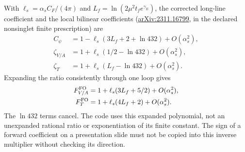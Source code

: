 \documentclass[11pt]{article}
\numberwithin{equation}{section}
\begin{document}
With \(\ell_s=\alpha_s C_F/(4\pi)\) and
\(L_f=\ln(2\mu^2t_fe^{\gamma_E})\), the corrected long-line coefficient
\cite{BrambillaWang2024} and the local bilinear coefficients
(\href{https://arxiv.org/abs/2311.16799}{arXiv:2311.16799},
in the declared nonsinglet finite prescription) are
\begin{align}
 C_\psi&=1-\ell_s(3L_f+2+\ln432)+O(\alpha_s^2),\\
 \zeta_{V/A}&=1+\ell_s(1/2-\ln432)+O(\alpha_s^2),\\
 \zeta_T&=1+\ell_s(L_f-\ln432)+O(\alpha_s^2).
\end{align}
Expanding the ratio consistently through one loop gives
\begin{align}
 F_{V/A}^{\rm FO}&=1+\ell_s(3L_f+5/2)+O(\alpha_s^2),\\
 F_T^{\rm FO}&=1+\ell_s(4L_f+2)+O(\alpha_s^2).
\label{eq:l32x64-inverse-expanded}
\end{align}
The \(\ln432\) terms cancel.  The code uses this expanded polynomial,
not an unexpanded rational ratio or exponentiation of its finite constant.
The sign of a forward coefficient on a presentation slide must not be
copied into this inverse multiplier without checking its direction.
\end{document}
